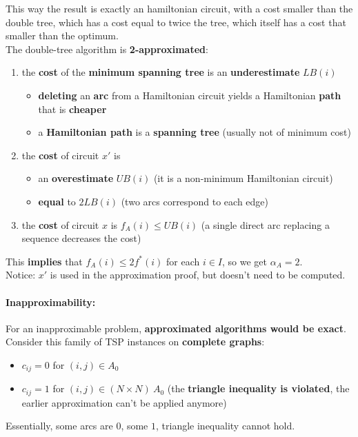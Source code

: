 \documentclass[11pt]{article}
\begin{document}
	This way the result is exactly an hamiltonian circuit, with a cost smaller than the double tree, which has a cost equal to twice the tree, which itself has a cost that smaller than the optimum.\\
	
	The double-tree algorithm is \textbf{2-approximated}:
	\begin{enumerate}
		\item the \textbf{cost} of the \textbf{minimum spanning tree} is an \textbf{underestimate} $LB (i )$
		\begin{itemize}
			\item \textbf{deleting} an \textbf{arc} from a Hamiltonian circuit yields a Hamiltonian \textbf{path} that is \textbf{cheaper}
			\item a \textbf{Hamiltonian path} is a \textbf{spanning tree} (usually not of minimum cost)
		\end{itemize}
		\item the \textbf{cost} of circuit $x'$ is
		\begin{itemize}
			\item an \textbf{overestimate} $UB (i )$ (it is a non-minimum Hamiltonian circuit)
			\item \textbf{equal} to $2LB (i )$ (two arcs correspond to each edge)
		\end{itemize}
		\item the \textbf{cost} of circuit $x$ is $f_A (i ) \leq UB (i )$ (a single direct arc replacing a sequence decreases the cost)
	\end{enumerate}
	This \textbf{implies} that $f_A (i ) \leq 2f^\ast (i )$ for each $i \in I$, so we get $\alpha_A = 2$.\\
	
	Notice: $x'$ is used in the approximation proof, but doesn't need to be computed.\\
	
	\newpage
	
	\paragraph{Inapproximability:} For an inapproximable problem, \textbf{approximated algorithms would be exact}.\\
	Consider this family of TSP instances on \textbf{complete graphs}:
	\begin{itemize}
		\item $c_{ij} = 0$ for $(i, j) \in A_0$
		\item $c_{ij} = 1$ for $(i, j) \in  (N \times N) \ A_0$ (the \textbf{triangle inequality is violated}, the earlier approximation can't be applied anymore)
	\end{itemize}
	Essentially, some arcs are $0$, some $1$, triangle inequality cannot hold.\\
	
\end{document}
